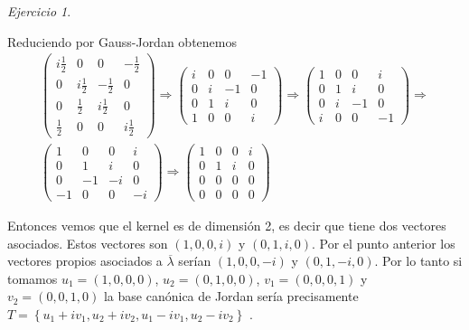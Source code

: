 \documentclass[11pt,a4paper]{article}
\theoremstyle{definition}
\theoremstyle{remark}
\newtheorem{exc}{Ejercicio}
\newcommand{\set}[1]{\left\lbrace #1 \right\rbrace}
\begin{document}
\begin{exc}
\begin{enumerate}
						Reduciendo por Gauss-Jordan obtenemos
						\begin{multline}
						\begin{pmatrix}
						i\frac{1}{2} & 0 & 0 & -\frac{1}{2}
						\\ 0 & i\frac{1}{2} & -\frac{1}{2} & 0 
						\\ 0 & \frac{1}{2} & i\frac{1}{2} & 0
						\\ \frac{1}{2} & 0 & 0 & i\frac{1}{2}
						\end{pmatrix} \Rightarrow
						\begin{pmatrix}
						i & 0 & 0 & -1
						\\ 0 & i & -1 & 0 
						\\ 0 & 1 & i & 0
						\\ 1 & 0 & 0 & i
						\end{pmatrix} \Rightarrow
						\begin{pmatrix}
						1 & 0 & 0 & i
						\\ 0 & 1 & i & 0
						\\ 0 & i & -1 & 0 
						\\ i & 0 & 0 & -1
						\end{pmatrix}
						\Rightarrow
						\\ \begin{pmatrix}
						1 & 0 & 0 & i
						\\ 0 & 1 & i & 0
						\\ 0 & -1 & -i & 0 
						\\ -1 & 0 & 0 & -i
						\end{pmatrix}
						\Rightarrow
						\begin{pmatrix}
						1 & 0 & 0 & i
						\\ 0 & 1 & i & 0
						\\ 0 & 0 & 0 & 0 
						\\ 0 & 0 & 0 & 0
						\end{pmatrix}
						 \nonumber		
						\end{multline}
						
						Entonces vemos que el kernel es de dimensión 2, es decir que tiene dos vectores asociados. Estos vectores son $ (1, 0,0,i) $ y $ (0,1,i,0) $. Por el punto anterior los vectores propios asociados a $ \overline{\lambda} $ serían $ (1, 0,0,-i) $ y $ (0,1,-i,0) $. Por lo tanto si tomamos $ u_1 = (1,0,0,0) $, $ u_2=(0,1,0,0) $, $ v_1=(0,0,0,1) $ y $ v_2 = (0,0,1,0) $ la base canónica de Jordan sería precisamente $ T = \set{u_1 + i v_1, u_2 + i v_2, u_1 - i v_1, u_2 - iv_2 } $ .
						

\end{enumerate}
\end{exc}
\end{document}
